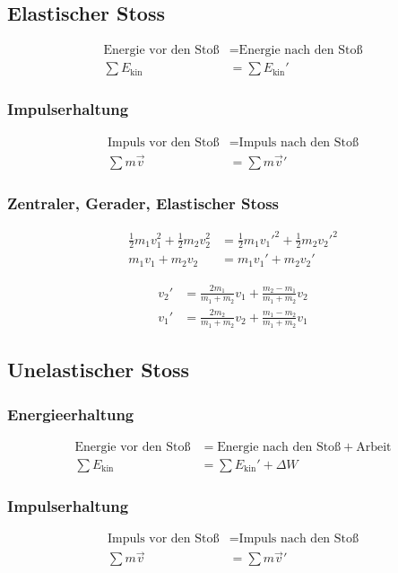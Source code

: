 \subsection{Elastischer Stoss}

\begin{align*}
\text{Energie vor den Stoß} &= \text{Energie nach den Stoß}\nonumber\\
\sum E_{\text{kin}}&=\sum E_{\text{kin}}'
\end{align*}


\subsubsection{Impulserhaltung}
\begin{align*}
\text{Impuls vor den Stoß} &= \text{Impuls nach den Stoß}\nonumber\\
\sum m\vec{v}&= \sum m\vec{v}'
\end{align*}


\subsubsection{Zentraler, Gerader, Elastischer Stoss}
\begin{align*}
\frac{1}{2}m_1v_1^2+\frac{1}{2}m_2v_2^2&=\frac{1}{2}m_1v_1'^2+\frac{1}{2}m_2v_2'^2\\
m_1v_1+m_2v_2&=m_1v_1'+m_2v_2'
\end{align*}

\begin{align*}
v_2'&=\frac{2m_1}{m_1+m_2}v_1+\frac{m_2-m_1}{m_1+m_2}v_2\\
v_1'&=\frac{2m_2}{m_1+m_2}v_2+\frac{m_1-m_2}{m_1+m_2}v_1
\end{align*}


\subsection{Unelastischer Stoss}

\subsubsection{Energieerhaltung}
\begin{align*}
\text{Energie vor den Stoß} &= \text{Energie nach den Stoß}+\text{Arbeit}\nonumber\\
\sum E_{\text{kin}}&=\sum E_{\text{kin}}'+\Delta W
\end{align*}


\subsubsection{Impulserhaltung}
\begin{align*}
\text{Impuls vor den Stoß} &= \text{Impuls nach den Stoß}\nonumber\\
\sum m\vec{v}&= \sum m\vec{v}'
\end{align*}



